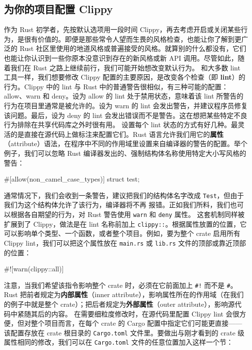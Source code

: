 \subsection{为你的项目配置 Clippy}
\label{idx:idx_fcf9005e}
作为 Rust 初学者，先按默认选项用一段时间 Clippy，再去考虑开启或关闭某些行为，是很有价值的。即便是那些常令人望而生畏的风格检查，也能让你了解到更广泛的 Rust 社区里使用的地道风格或普遍接受的风格。就算别的什么都没有，它们也能让你认识到一些你原本没意识到存在的新风格或新 API 调用。尽管如此，随着我们在 Rust 之路上继续前行，我们可能开始想改变默认行为。
和大多数 lint 工具一样，我们想要修改 Clippy 配置的主要原因，是改变各个检查（即 \textbf{lint}）的行为。Clippy 中的 lint 与 Rust 中的普通警告很相似，有三种可能的配置：allow、warn 和 deny。设为 allow 的 lint 处于禁用状态，意味着该 lint 所警告的行为在项目里通常是被允许的。设为 warn 的 lint 会发出警告，并建议程序员修复该问题。最后，设为 deny 的 lint 会发出错误而不是警告。这在想把某些特定不良行为排除在共享代码库之外时很有用。
设置每个 lint 状态的方式有好几种。最灵活的是直接在源代码上做标注来配置它们。Rust 语言允许我们用它的\textbf{属性}（attribute）语法，在程序中不同的作用域里设置来自编译器的警告的配置。举个例子，我们可以忽略 Rust 编译器发出的、强制结构体名称使用特定大小写风格的警告：
\begin{codebox}[rust]
#[allow(non_camel_case_types)]
struct test;
\end{codebox}
通常情况下，我们会收到一条警告，建议把我们的结构体名字改成
\texttt{Test}，但由于我们为这个结构体允许了该行为，编译器将不再
报错。正如我们所料，我们也可以根据各自期望的行为，对 Rust 警告使用 \texttt{warn} 和 \texttt{deny} 属性。
\label{idx:idx_cfd13e83}
这套机制同样被扩展到了 Clippy，做法是在 lint 名称前加上 \texttt{clippy::}。根据属性放置的位置，它可以影响单个类型、一个函数，或者整个项目。例如，要为整个 crate 启用所有 Clippy lint，我们可以把这个属性放在 \texttt{main.rs} 或 \texttt{lib.rs} 文件的顶部或靠近顶部的位置：
\begin{codebox}[rust]
#![warn(clippy::all)]
\end{codebox}
注意，当我们希望该指令影响整个 crate 时，必须在它前面加上 \texttt{\#!} 而不是 \texttt{\#}。Rust 把前者规定为\textbf{内部属性}（inner attribute），影响属性所在的作用域（在我们的例子中就是整个 crate）；把后者规定为\textbf{外部属性}（outer attribute），影响源代码中紧随其后的内容。
在需要细粒度修改时，在源代码里配置 Clippy lint 会很方便，但对整个项目而言，在每个 crate 的 Cargo 配置中指定它们可能更直接——该配置存放在 crate 根目录的 \texttt{Cargo.toml} 文件里。要做出与刚才看到的 crate 级属性相同的修改，我们可以在 \texttt{Cargo.toml} 文件的任意位置加入这样一个节：
